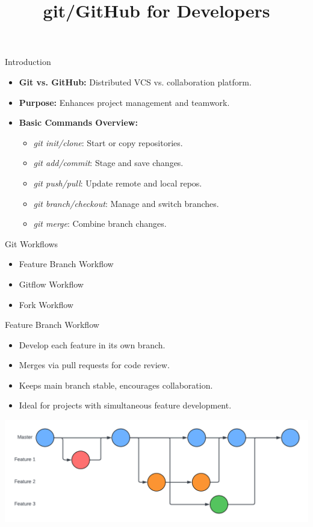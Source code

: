 \documentclass[aspectratio=169]{beamer}
\title{git/GitHub for Developers}
\institute{Engineers for Exploration, UC San Diego}
\begin{document}
\maketitle
\begin{frame}{Introduction}
    \begin{itemize}
        \item \textbf{Git vs. GitHub:} Distributed VCS vs. collaboration platform.
        \item \textbf{Purpose:} Enhances project management and teamwork.
        \item \textbf{Basic Commands Overview:}
        \begin{itemize}
            \item \textit{git init/clone}: Start or copy repositories.
            \item \textit{git add/commit}: Stage and save changes.
            \item \textit{git push/pull}: Update remote and local repos.
            \item \textit{git branch/checkout}: Manage and switch branches.
            \item \textit{git merge}: Combine branch changes.
        \end{itemize}
    \end{itemize}
\end{frame}
\begin{frame}{Git Workflows}
    \begin{itemize}
        \item Feature Branch Workflow
        \item Gitflow Workflow
        \item Fork Workflow
    \end{itemize}
\end{frame}
\begin{frame}{Feature Branch Workflow}
    \begin{itemize}
        \item Develop each feature in its own branch.
        \item Merges via pull requests for code review.
        \item Keeps main branch stable, encourages collaboration.
        \item Ideal for projects with simultaneous feature development.
    \end{itemize}
    \begin{center}
        \includegraphics[scale=.25]{feature_workflow_diagram.png}
    \end{center}
\end{frame}
\end{document}
